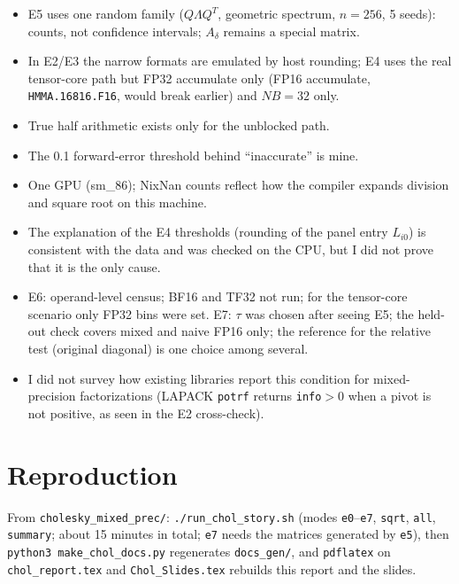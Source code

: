 \documentclass[11pt,a4paper]{article}
\begin{document}
\begin{itemize}
  \item E5 uses one random family ($Q\Lambda Q^T$, geometric spectrum, $n=256$, 5 seeds): counts, not confidence intervals; $A_\delta$ remains a special matrix.
  \item In E2/E3 the narrow formats are emulated by host rounding; E4 uses the real tensor-core path but FP32 accumulate only (FP16 accumulate, \texttt{HMMA.16816.F16}, would break earlier) and $NB=32$ only.
  \item True half arithmetic exists only for the unblocked path.
  \item The 0.1 forward-error threshold behind ``inaccurate'' is mine.
  \item One GPU (sm\_86); NixNan counts reflect how the compiler expands division and square root on this machine.
  \item The explanation of the E4 thresholds (rounding of the panel entry $L_{i0}$) is consistent with the data and was checked on the CPU, but I did not prove that it is the only cause.
  \item E6: operand-level census; BF16 and TF32 not run; for the tensor-core scenario only FP32 bins were set. E7: $\tau$ was chosen after seeing E5; the held-out check covers mixed and naive FP16 only; the reference for the relative test (original diagonal) is one choice among several.
  \item I did not survey how existing libraries report this condition for mixed-precision factorizations (LAPACK \texttt{potrf} returns \texttt{info}$>0$ when a pivot is not positive, as seen in the E2 cross-check).
\end{itemize}

\section*{Reproduction}

From \texttt{cholesky\_mixed\_prec/}: \texttt{./run\_chol\_story.sh} (modes \texttt{e0}--\texttt{e7}, \texttt{sqrt}, \texttt{all}, \texttt{summary}; about 15 minutes in total; \texttt{e7} needs the matrices generated by \texttt{e5}), then
\texttt{python3 make\_chol\_docs.py} regenerates \texttt{docs\_gen/}, and \texttt{pdflatex} on \texttt{chol\_report.tex} and \texttt{Chol\_Slides.tex} rebuilds this report and the slides.
\end{document}
